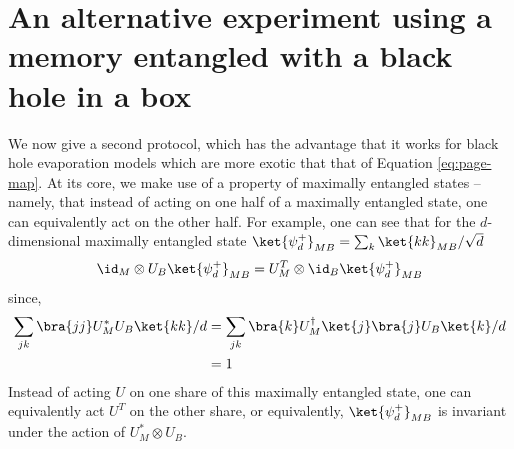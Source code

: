 \documentclass[11pt,a4paper]{article}
\begin{document}
\section{An alternative experiment using a memory entangled with a black hole in a box}
\label{sec:box}

We now give a second protocol, which has the advantage that it works for black hole evaporation models which are more exotic that that of Equation \eqref{eq:page-map}.
At its core, we make use of a  property of maximally entangled states -- namely, that instead of acting on one half of a maximally entangled state, one can equivalently act on the other half. For example, one can see that for the $d$-dimensional maximally entangled state $\ket{\psi^+_d}_{MB}=\sum_k\ket{kk}_{MB}/\sqrt{d}$
\begin{align}
\id_{M}\otimes U_B\ket{\psi^+_d}_{MB}= U_{M}^T\otimes\id_{B}\ket{\psi^+_d}_{MB}
\label{eq:uustar}
\end{align}
since,
\begin{align}
\sum_{jk}\bra{jj}U_M^*U_B\ket{kk}/{d}&=\sum_{jk}\bra{k}U_M^\dagger\ket{j}\bra{j}U_B\ket{k}/{d} \\
&=1
\end{align}
Instead of acting $U$ on one share of this maximally entangled state, one can equivalently act $U^T$ on the other share, or equivalently,  $\ket{\psi^+_d}_{MB}$ is invariant
under the action of $U_M^*\otimes U_B$.

 
\end{document}
